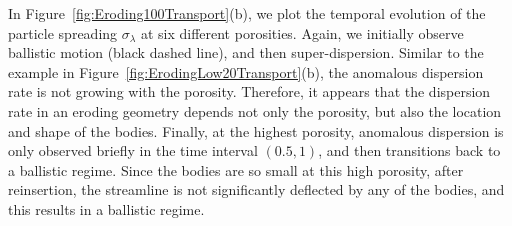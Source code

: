 \documentclass[preprint,10pt]{elsarticle}
\begin{document}
In Figure~\ref{fig:Eroding100Transport}(b), we plot the temporal
evolution of the particle spreading $\sigma_\lambda$ at six different
porosities. Again, we initially observe ballistic motion (black dashed
line), and then super-dispersion.  Similar to the example in
Figure~\ref{fig:ErodingLow20Transport}(b), the anomalous dispersion rate
is not growing with the porosity.  Therefore, it appears that the
dispersion rate in an eroding geometry depends not only the porosity,
but also the location and shape of the bodies.  Finally, at the highest
porosity, anomalous dispersion is only observed briefly in the time
interval $(0.5,1)$, and then transitions back to a ballistic regime.
Since the bodies are so small at this high porosity, after reinsertion,
the streamline is not significantly deflected by any of the bodies, and
this results in a ballistic regime.
\end{document}
